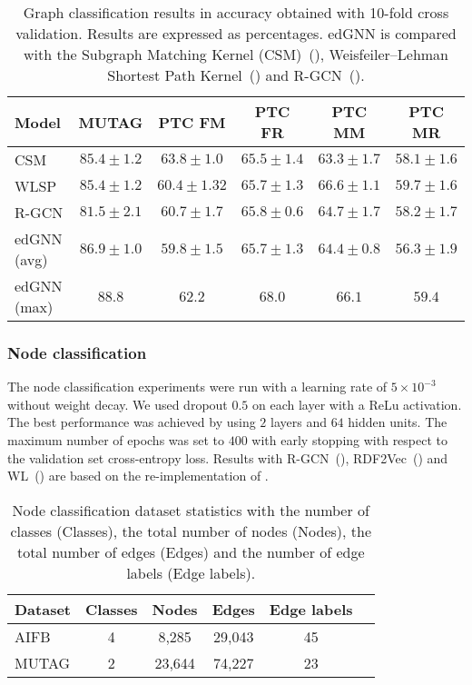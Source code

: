 \documentclass{article} \usepackage{iclr2019_conference,times}
\begin{document}
\begin{table}[h]
  \caption{Graph classification results in accuracy obtained with 10-fold cross validation. Results are expressed as percentages. edGNN is compared with the Subgraph Matching Kernel (CSM)~(\cite{Kriege2012}), Weisfeiler--Lehman Shortest Path Kernel~(\cite{Shervashidze2011}) and R-GCN~(\cite{Schlichtkrull2018}).}
  \label{tab:graph_class}
  \centering
  \begin{tabular}{lccccc}
  \toprule
    Model & MUTAG & PTC FM & PTC FR & PTC MM & PTC MR \\
    \midrule
    CSM & ${85.4 \pm 1.2}$  & $\mathbf{63.8 \pm 1.0}$ & $65.5 \pm 1.4$  & $63.3 \pm 1.7$ & $58.1 \pm 1.6$ \\
    WLSP & ${85.4 \pm 1.2}$ & $60.4 \pm 1.32$ & ${65.7 \pm 1.3}$ & $\mathbf{66.6 \pm 1.1}$ & $\mathbf{59.7 \pm 1.6}$ \\
    R-GCN & $81.5 \pm 2.1$  & $60.7 \pm 1.7$  & $\mathbf{65.8 \pm 0.6}$ & $64.7 \pm 1.7$  & $58.2 \pm 1.7$ \\
    \midrule
    edGNN (avg) & $\mathbf{86.9 \pm 1.0}$ & $59.8 \pm 1.5$          & ${65.7 \pm 1.3}$ & $64.4 \pm 0.8$          & $56.3 \pm 1.9$ \\
    edGNN (max) & $88.8$          & $62.2$          & $68.0$          & $66.1$          & $59.4$ \\
    
    \bottomrule
  \end{tabular}
\end{table}


\subsubsection{Node classification}

The node classification experiments were run with a learning rate of $5 \times 10^{-3}$  without weight decay. We used dropout $0.5$ on each layer with a ReLu activation. The best performance was achieved by using $2$ layers and $64$ hidden units. The maximum number of epochs was set to $400$ with early stopping with respect to the validation set cross-entropy loss. Results with R-GCN~(\cite{Schlichtkrull2018}), RDF2Vec~(\cite{Ristoski2016a}) and WL~(\cite{Shervashidze2011}) are based on the re-implementation of \cite{Schlichtkrull2018}. 

\begin{table}[h]
  \caption{Node classification dataset statistics with the number of classes (Classes), the total number of nodes (Nodes), the total number of edges (Edges) and the number of edge labels (Edge labels).}
  \label{tab:node_class_stat}
  \centering
  \begin{tabular}{lccccc}
  \toprule
    Dataset & Classes & Nodes & Edges & Edge labels   \\
    \midrule
    AIFB  &   4 & 8,285  & 29,043  & 45  \\
    MUTAG &   2 & 23,644 & 74,227  & 23  \\
    \bottomrule
  \end{tabular}
\end{table}
\end{document}
